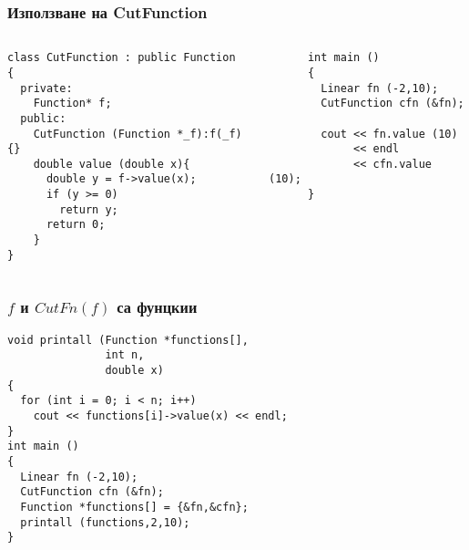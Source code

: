 \documentclass{beamer}
\begin{document}
\begin{frame}[fragile]
\frametitle{Използване на CutFunction}


\begin{columns}[t]
  \begin{column}{0.50\textwidth}


      \begin{flushleft}
\begin{lstlisting}
class CutFunction : public Function
{
  private:
    Function* f;
  public:
    CutFunction (Function *_f):f(_f){}
    double value (double x){
      double y = f->value(x);
      if (y >= 0)
        return y;
      return 0;
    }
}
\end{lstlisting}

      \end{flushleft}

  \end{column}
  \begin{column}{0.5\textwidth}
      \begin{flushleft}

      \begin{lstlisting}
      int main ()
      {
        Linear fn (-2,10);
        CutFunction cfn (&fn);

        cout << fn.value (10)
             << endl
             << cfn.value (10);
      }
      \end{lstlisting}

      \end{flushleft}

  \end{column}
\end{columns}



\end{frame}

\begin{frame}[fragile]
\frametitle{$f$ и $CutFn(f)$ са фунцкии}


\begin{flushleft}
\begin{lstlisting}
void printall (Function *functions[],
               int n,
               double x)
{
  for (int i = 0; i < n; i++)
    cout << functions[i]->value(x) << endl;
}
int main ()
{
  Linear fn (-2,10);
  CutFunction cfn (&fn);
  Function *functions[] = {&fn,&cfn};
  printall (functions,2,10);
}
\end{lstlisting}

\end{flushleft}
\end{frame}
\end{document}
